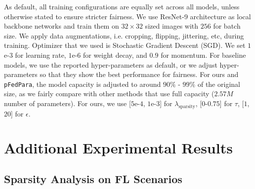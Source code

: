 As default, all training configurations are equally set across all models, unless otherwise stated to ensure stricter fairness. We use ResNet-9 architecture as local backbone networks and train them on $32\times32$ sized images with $256$ for batch size. We apply data augmentations, i.e. cropping, flipping, jittering, etc, during training. Optimizer that we used is Stochastic Gradient Descent (SGD). We set $1$e-$3$ for learning rate, $1$e-$6$ for weight decay, and  $0.9$ for momentum. For baseline models, we use the reported hyper-parameters as default, or we adjust hyper-parameters so that they show the best performance for fairness. For ours and \texttt{pFedPara}, the model capacity is adjusted to around $90\%$ - $99\%$ of the original size, as we fairly compare with other methods that use full capacity ($2.57M$ number of parameters). For ours, we use [$5$e-$4$, $1$e-$3$] for $\lambda_{\text{sparsity}}$, [$0$-$0.75$] for $\tau$, [$1$, $20$] for $\epsilon$. 

\section{Additional Experimental Results}
\label{appdx:experiment}


% 



\subsection{Sparsity Analysis on FL Scenarios}
\label{appdx:sparisty}

